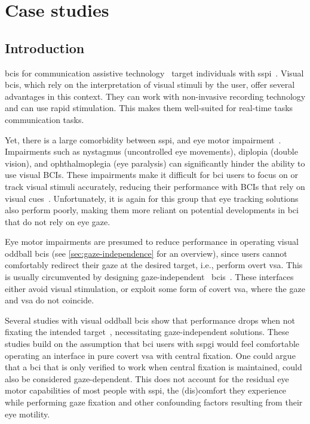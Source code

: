 \chapter{Case studies}
\label{sec:patients}
\section{Introduction}

\Acp{bci} for communication assistive technology~\cite{Millan2010}
target individuals with \ac{sspi}~\cite{Peters2022}.
Visual \acp{bci}, which rely on the interpretation of visual stimuli by the user,
offer several advantages in this context.
They can work with non-invasive recording technology and can use rapid
stimulation.
This makes them well-suited for real-time tasks communication tasks.

Yet, there is a large comorbidity between \ac{sspi}, and eye motor impairment~\cite{FriedOken2020}.
Impairments such as nystagmus (uncontrolled eye movements), diplopia (double
vision), and ophthalmoplegia (eye paralysis) can significantly hinder
the ability to use visual BCIs. These impairments make it difficult for
\ac{bci} users to focus on or track visual stimuli accurately, reducing their
performance with BCIs that rely on visual cues~\cite{McCane2014,FriedOken2020,Pasqualotto2015}.
Unfortunately, it is again for this group that eye tracking solutions also
perform poorly, making them more reliant on potential developments in \ac{bci}
that do not rely on eye gaze.

Eye motor impairments are presumed to reduce performance in operating visual
oddball \ac{bci}s (see \autoref{sec:gaze-independence} for an overview), since users
cannot comfortably redirect their gaze at the desired target,
i.e., perform overt \ac{vsa}.
This is usually circumvented by designing gaze-independent~
\acp{bci}~\cite{Riccio2012}.
These interfaces either avoid visual stimulation, or exploit some form of
covert \ac{vsa}, where the gaze and \ac{vsa} do not coincide.

Several studies with visual oddball \acp{bci} show that performance drops when not fixating the intended
target~\cite{Brunner2010, Treder2010, RonAngevin2019}, necessitating
gaze-independent solutions.
These studies build on the assumption that \ac{bci} users with \ac{sspgi}
would feel comfortable operating an interface in pure covert \ac{vsa} with
central fixation.
One could argue that a \ac{bci} that is only verified to work when central
fixation is maintained, could also be considered gaze-dependent.
This does not account for the residual eye motor capabilities of most people
with \ac{sspi}, the (dis)comfort they experience while
performing gaze fixation and other confounding factors resulting from their eye
motility.

